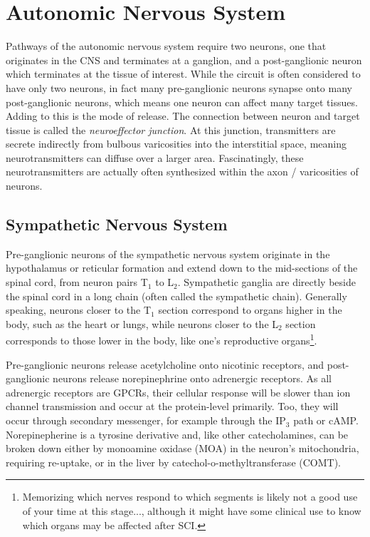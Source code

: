 \documentclass[12pt]{report}
\begin{document}
\section{Autonomic Nervous System}

\label{sec:Autonomic}

Pathways of the autonomic nervous system require two neurons, one that originates in the CNS and terminates at a ganglion, and a post-ganglionic neuron which terminates at the tissue of interest. While the circuit is often considered to have only two neurons, in fact many pre-ganglionic neurons synapse onto many post-ganglionic neurons, which means one neuron can affect many target tissues. Adding to this is the mode of release. The connection between neuron and target tissue is called the \textit{neuroeffector junction}. At this junction, transmitters are secrete indirectly from bulbous varicosities into the interstitial space, meaning neurotransmitters can diffuse over a larger area. Fascinatingly, these neurotransmitters are actually often synthesized within the axon / varicosities of neurons. 

\subsection{Sympathetic Nervous System}
Pre-ganglionic neurons of the sympathetic nervous system originate in the hypothalamus or reticular formation and extend down to the mid-sections of the spinal cord, from neuron pairs T$_1$ to L$_2$. Sympathetic ganglia are directly beside the spinal cord in a long chain (often called the sympathetic chain). Generally speaking, neurons closer to the T$_1$ section correspond to organs higher in the body, such as the heart or lungs, while neurons closer to the L$_2$ section corresponds to those lower in the body, like one's reproductive organs\footnote{Memorizing which nerves respond to which segments is likely not a good use of your time at this stage..., although it might have some clinical use to know which organs may be affected after SCI.}.\newline

Pre-ganglionic neurons release acetylcholine onto nicotinic receptors,  and post-ganglionic neurons release norepinephrine onto adrenergic receptors. As all adrenergic receptors are GPCRs, their cellular response will be slower than ion channel transmission and occur at the protein-level primarily. Too, they will occur through secondary messenger, for example through the IP$_3$ path or cAMP. Norepinepherine is a tyrosine derivative and, like other catecholamines, can be broken down either by monoamine oxidase (MOA) in the neuron's mitochondria, requiring re-uptake, or in the liver by catechol-o-methyltransferase (COMT).\newline
\end{document}
